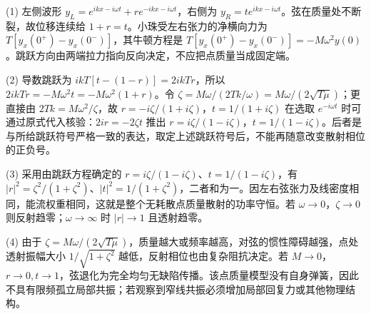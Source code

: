 (1) 左侧波形 \(y_L=e^{ikx-i\omega t}+re^{-ikx-i\omega t}\)，右侧为 \(y_R=te^{ikx-i\omega t}\)。弦在质量处不断裂，故位移连续给 \(1+r=t\)。小珠受左右张力的净横向力为 \(T[y_x(0^+)-y_x(0^-)]\)，其牛顿方程是 \(T[y_x(0^+)-y_x(0^-)]=-M\omega^2y(0)\)。跳跃方向由两端拉力指向反向决定，不应把点质量当成固定端。

(2) 导数跳跃为 \(ikT[t-(1-r)]=2ikTr\)，所以 \(2ikTr=-M\omega^2t=-M\omega^2(1+r)\)。令 \(\zeta=M\omega/(2T k/\omega)=M\omega/(2\sqrt{T\mu})\)；更直接由 \(2Tk=M\omega^2/\zeta\)，故 \(r=-i\zeta/(1+i\zeta)\)，\(t=1/(1+i\zeta)\) 在选取 \(e^{-i\omega t}\) 时可通过原式代入核验：\(2i r=-2\zeta t\) 推出 \(r=i\zeta/(1-i\zeta)\)，\(t=1/(1-i\zeta)\)。后者是与所给跳跃符号严格一致的表达，取定上述跳跃符号后，不能再随意改变散射相位的正负号。

(3) 采用由跳跃方程确定的 \(r=i\zeta/(1-i\zeta)\)、\(t=1/(1-i\zeta)\)，有 \(|r|^2=\zeta^2/(1+\zeta^2)\)、\(|t|^2=1/(1+\zeta^2)\)，二者和为一。因左右弦张力及线密度相同，能流权重相同，这就是整个无耗散点质量散射的功率守恒。若 \(\omega\to0\)，\(\zeta\to0\) 则反射趋零；\(\omega\to\infty\) 时 \(|r|\to1\) 且透射趋零。

(4) 由于 \(\zeta=M\omega/(2\sqrt{T\mu})\)，质量越大或频率越高，对弦的惯性障碍越强，点处透射振幅大小 \(1/\sqrt{1+\zeta^2}\) 越低，反射相位也由复杂阻抗决定。若 \(M\to0\)，\(r\to0,t\to1\)，弦退化为完全均匀无缺陷传播。该点质量模型没有自身弹簧，因此不具有限频孤立局部共振；若观察到窄线共振必须增加局部回复力或其他物理结构。

